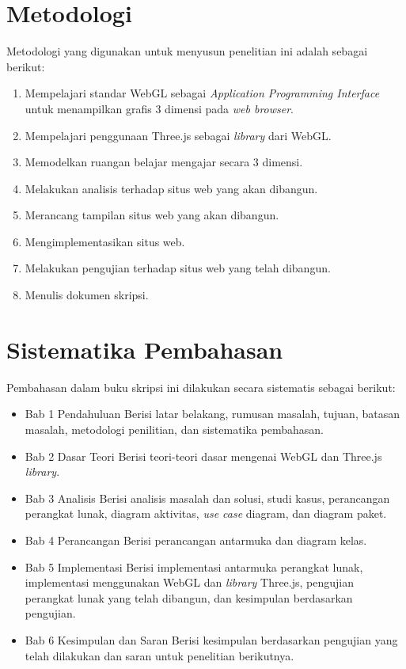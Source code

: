 \section{Metodologi}
\label{sec:metlit}
Metodologi yang digunakan untuk menyusun penelitian ini adalah sebagai berikut:
\begin{enumerate}
    \item Mempelajari standar WebGL sebagai \textit{Application Programming Interface} untuk menampilkan grafis 3 dimensi pada \textit{web browser}.
    \item Mempelajari penggunaan Three.js sebagai \textit{library} dari WebGL.
    \item Memodelkan ruangan belajar mengajar secara 3 dimensi.
    \item Melakukan analisis terhadap situs web yang akan dibangun.
    \item Merancang tampilan situs web yang akan dibangun.
    \item Mengimplementasikan situs web.
    \item Melakukan pengujian terhadap situs web yang telah dibangun.
    \item Menulis dokumen skripsi.
\end{enumerate}

\section{Sistematika Pembahasan}
\label{sec:sispem}
Pembahasan dalam buku skripsi ini dilakukan secara sistematis sebagai berikut:
\begin{itemize}
    \item Bab 1 Pendahuluan
    Berisi latar belakang, rumusan masalah, tujuan, batasan masalah, metodologi penilitian, dan sistematika pembahasan.
    \item Bab 2 Dasar Teori
    Berisi teori-teori dasar mengenai WebGL dan Three.js \textit{library}.
    \item Bab 3 Analisis
    Berisi analisis masalah dan solusi, studi kasus, perancangan perangkat lunak, diagram aktivitas, \textit{use case} diagram, dan diagram paket.
    \item Bab 4 Perancangan
    Berisi perancangan antarmuka dan diagram kelas.
    \item Bab 5 Implementasi
    Berisi implementasi antarmuka perangkat lunak, implementasi menggunakan WebGL dan \textit{library} Three.js, pengujian perangkat lunak yang telah dibangun, dan kesimpulan berdasarkan pengujian.
    \item Bab 6 Kesimpulan dan Saran
    Berisi kesimpulan berdasarkan pengujian yang telah dilakukan dan saran untuk penelitian berikutnya.
\end{itemize}